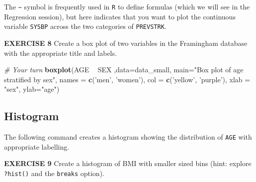 \documentclass[
]{article}
\newenvironment{Shaded}{\begin{snugshade}}{\end{snugshade}}
\newcommand{\CommentTok}[1]{\textcolor[rgb]{0.56,0.35,0.01}{\textit{#1}}}
\newcommand{\DataTypeTok}[1]{\textcolor[rgb]{0.13,0.29,0.53}{#1}}
\newcommand{\DecValTok}[1]{\textcolor[rgb]{0.00,0.00,0.81}{#1}}
\newcommand{\KeywordTok}[1]{\textcolor[rgb]{0.13,0.29,0.53}{\textbf{#1}}}
\newcommand{\NormalTok}[1]{#1}
\newcommand{\OperatorTok}[1]{\textcolor[rgb]{0.81,0.36,0.00}{\textbf{#1}}}
\newcommand{\StringTok}[1]{\textcolor[rgb]{0.31,0.60,0.02}{#1}}
\begin{document}
The \texttt{\textasciitilde{}} symbol is frequently used in \texttt{R}
to define formulas (which we will see in the Regression session), but
here indicates that you want to plot the continuous variable
\texttt{SYSBP} across the two categories of \texttt{PREVSTRK}.

\textbf{EXERCISE 8} Create a box plot of two variables in the Framingham
database with the appropriate title and labels.

\begin{Shaded}
\begin{Highlighting}[]
\CommentTok{# Your turn}
\KeywordTok{boxplot}\NormalTok{(AGE }\OperatorTok{~}\StringTok{ }\NormalTok{SEX ,}\DataTypeTok{data=}\NormalTok{data_small, }
        \DataTypeTok{main=}\StringTok{"Box plot of age stratified by sex"}\NormalTok{,}
        \DataTypeTok{names =} \KeywordTok{c}\NormalTok{(}\StringTok{'men'}\NormalTok{, }\StringTok{'women'}\NormalTok{),}
        \DataTypeTok{col =} \KeywordTok{c}\NormalTok{(}\StringTok{'yellow'}\NormalTok{, }\StringTok{'purple'}\NormalTok{),}
        \DataTypeTok{xlab =} \StringTok{"sex"}\NormalTok{, }\DataTypeTok{ylab=}\StringTok{"age"}\NormalTok{)}
\end{Highlighting}
\end{Shaded}

\hypertarget{histogram}{%
\subsection{Histogram}\label{histogram}}

The following command creates a histogram showing the distribution of
\texttt{AGE} with appropriate labelling.

\begin{Shaded}
\end{Shaded}

\textbf{EXERCISE 9} Create a histogram of BMI with smaller sized bins
(hint: explore \texttt{?hist()} and the \texttt{breaks} option).

\begin{Shaded}
\end{Shaded}
\end{document}
